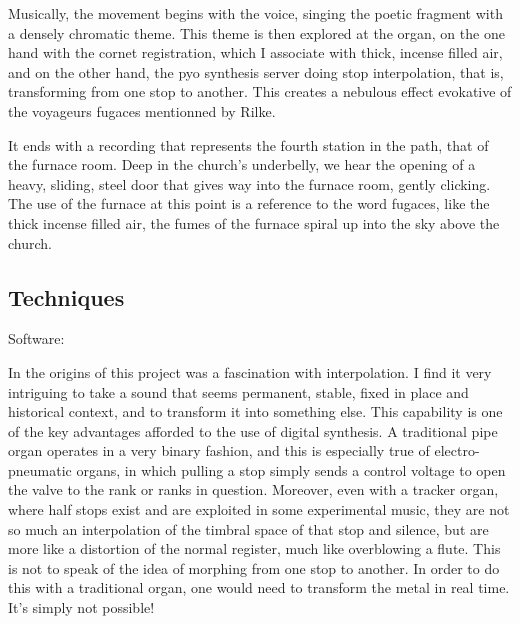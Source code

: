 \documentclass[12pt,twoside,maitrise]{dms_ks}
\theoremstyle{definition}
\begin{document}
Musically, the movement begins with the voice, singing the poetic fragment with a densely chromatic theme.
This theme is then explored at the organ, on the one hand with the cornet registration, which I associate with thick, incense filled air, and on the other hand, the pyo synthesis server doing stop interpolation, that is, transforming from one stop to another.
This creates a nebulous effect evokative of the voyageurs fugaces mentionned by Rilke.

It ends with a recording that represents the fourth station in the path, that of the furnace room.
Deep in the church's underbelly, we hear the opening of a heavy, sliding, steel door that gives way into the furnace room, gently clicking.
The use of the furnace at this point is a reference to the word fugaces, like the thick incense filled air, the fumes of the furnace spiral up into the sky above the church.

\subsection{Techniques}

Software:

In the origins of this project was a fascination with interpolation.
I find it very intriguing to take a sound that seems permanent, stable, fixed in place and historical context, and to transform it into something else.
This capability is one of the key advantages afforded to the use of digital synthesis.
A traditional pipe organ operates in a very binary fashion, and this is especially true of electro-pneumatic organs, in which pulling a stop simply sends a control voltage to open the valve to the rank or ranks in question.
Moreover, even with a tracker organ, where half stops exist and are exploited in some experimental music, they are not so much an interpolation of the timbral space of that stop and silence, but are more like a distortion of the normal register, much like overblowing a flute.
This is not to speak of the idea of morphing from one stop to another.
In order to do this with a traditional organ, one would need to transform the metal in real time.
It's simply not possible!
\end{document}
